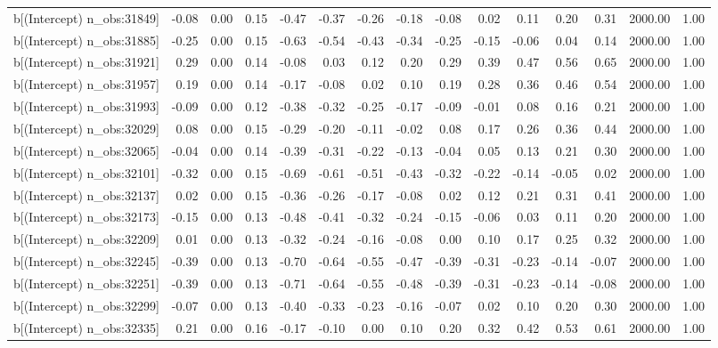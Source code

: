\begin{table}[ht]
\begin{tabular}{rrrrrrrrrrrrrrr}
  b[(Intercept) n\_obs:31849] & -0.08 & 0.00 & 0.15 & -0.47 & -0.37 & -0.26 & -0.18 & -0.08 & 0.02 & 0.11 & 0.20 & 0.31 & 2000.00 & 1.00 \\ 
  b[(Intercept) n\_obs:31885] & -0.25 & 0.00 & 0.15 & -0.63 & -0.54 & -0.43 & -0.34 & -0.25 & -0.15 & -0.06 & 0.04 & 0.14 & 2000.00 & 1.00 \\ 
  b[(Intercept) n\_obs:31921] & 0.29 & 0.00 & 0.14 & -0.08 & 0.03 & 0.12 & 0.20 & 0.29 & 0.39 & 0.47 & 0.56 & 0.65 & 2000.00 & 1.00 \\ 
  b[(Intercept) n\_obs:31957] & 0.19 & 0.00 & 0.14 & -0.17 & -0.08 & 0.02 & 0.10 & 0.19 & 0.28 & 0.36 & 0.46 & 0.54 & 2000.00 & 1.00 \\ 
  b[(Intercept) n\_obs:31993] & -0.09 & 0.00 & 0.12 & -0.38 & -0.32 & -0.25 & -0.17 & -0.09 & -0.01 & 0.08 & 0.16 & 0.21 & 2000.00 & 1.00 \\ 
  b[(Intercept) n\_obs:32029] & 0.08 & 0.00 & 0.15 & -0.29 & -0.20 & -0.11 & -0.02 & 0.08 & 0.17 & 0.26 & 0.36 & 0.44 & 2000.00 & 1.00 \\ 
  b[(Intercept) n\_obs:32065] & -0.04 & 0.00 & 0.14 & -0.39 & -0.31 & -0.22 & -0.13 & -0.04 & 0.05 & 0.13 & 0.21 & 0.30 & 2000.00 & 1.00 \\ 
  b[(Intercept) n\_obs:32101] & -0.32 & 0.00 & 0.15 & -0.69 & -0.61 & -0.51 & -0.43 & -0.32 & -0.22 & -0.14 & -0.05 & 0.02 & 2000.00 & 1.00 \\ 
  b[(Intercept) n\_obs:32137] & 0.02 & 0.00 & 0.15 & -0.36 & -0.26 & -0.17 & -0.08 & 0.02 & 0.12 & 0.21 & 0.31 & 0.41 & 2000.00 & 1.00 \\ 
  b[(Intercept) n\_obs:32173] & -0.15 & 0.00 & 0.13 & -0.48 & -0.41 & -0.32 & -0.24 & -0.15 & -0.06 & 0.03 & 0.11 & 0.20 & 2000.00 & 1.00 \\ 
  b[(Intercept) n\_obs:32209] & 0.01 & 0.00 & 0.13 & -0.32 & -0.24 & -0.16 & -0.08 & 0.00 & 0.10 & 0.17 & 0.25 & 0.32 & 2000.00 & 1.00 \\ 
  b[(Intercept) n\_obs:32245] & -0.39 & 0.00 & 0.13 & -0.70 & -0.64 & -0.55 & -0.47 & -0.39 & -0.31 & -0.23 & -0.14 & -0.07 & 2000.00 & 1.00 \\ 
  b[(Intercept) n\_obs:32251] & -0.39 & 0.00 & 0.13 & -0.71 & -0.64 & -0.55 & -0.48 & -0.39 & -0.31 & -0.23 & -0.14 & -0.08 & 2000.00 & 1.00 \\ 
  b[(Intercept) n\_obs:32299] & -0.07 & 0.00 & 0.13 & -0.40 & -0.33 & -0.23 & -0.16 & -0.07 & 0.02 & 0.10 & 0.20 & 0.30 & 2000.00 & 1.00 \\ 
  b[(Intercept) n\_obs:32335] & 0.21 & 0.00 & 0.16 & -0.17 & -0.10 & 0.00 & 0.10 & 0.20 & 0.32 & 0.42 & 0.53 & 0.61 & 2000.00 & 1.00 \\ 

\end{tabular}
\end{table}
